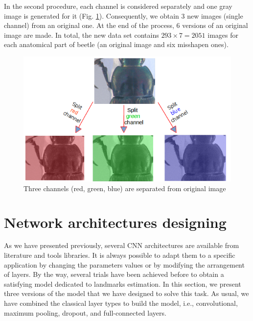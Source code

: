 \documentclass[review]{elsarticle}
\begin{document}
In the second procedure, each channel is considered separately and one gray image is generated for it (Fig. \ref{figaug2}). Consequently, we obtain 3 new images (single channel) from an original one. At the end of the process, $6$ versions of an original image are made. In total, the new data set contains $293 \times 7 = 2051$ images for each anatomical part of beetle (an original image and six misshapen ones).

\begin{figure}[h]
	\centering
	\includegraphics[scale=0.4]{images/sp_channels}
	\caption{Three channels (red, green, blue) are separated from original image}
	\label{figaug2}
\end{figure}

\section{Network architectures designing}
\label{Sneuralnetwork}
As we have presented previously, several CNN architectures are available from literature and tools libraries. It is always possible to adapt them to a specific application by changing the parameters values or by modifying the arrangement of layers. By the way, several trials have been achieved before to obtain a satisfying model dedicated to landmarks estimation. In this section, we present three versions of the model that we have designed to solve this task. As usual, we have combined the classical layer types to build the model, i.e., convolutional, maximum pooling, dropout, and full-connected layers.
\end{document}
